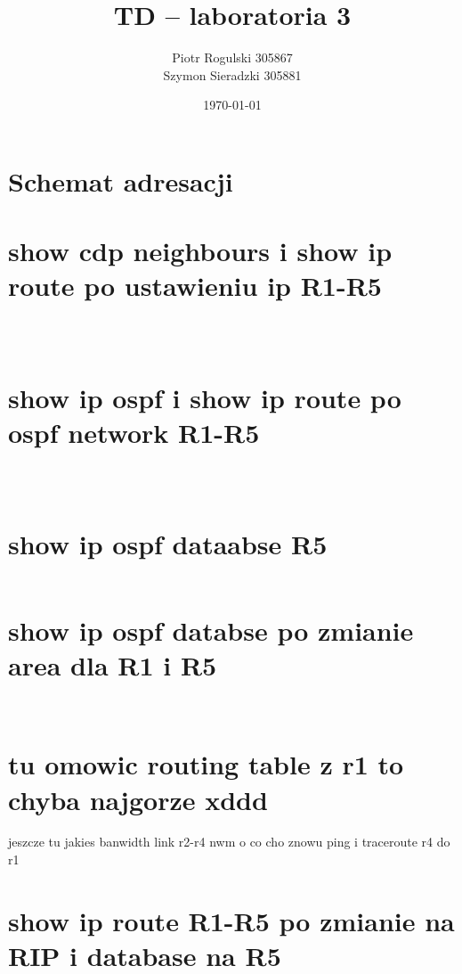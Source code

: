 \documentclass[a4paper,12pt,notitlepage]{article}
\title{\textbf{TD -- laboratoria 3}}
\author{Piotr Rogulski 305867 \\ Szymon Sieradzki 305881}
\date{\today}
\begin{document}
\maketitle
\section{Schemat adresacji}

\section{show cdp neighbours i show ip route po ustawieniu ip R1-R5}
\inputminted[label=Przełączanie na ipv6, firstline=152, lastline=170]{text}{R1.txt}
\inputminted[label=Przełączanie na ipv6, firstline=293, lastline=316]{text}{R2_1.txt}
\inputminted[label=Przełączanie na ipv6, firstline=210, lastline=237]{text}{R5.txt}
\section{show ip ospf i show ip route po ospf network R1-R5}
\inputminted[label=Przełączanie na ipv6, firstline=228, lastline=279]{text}{R1.txt}
\inputminted[label=Przełączanie na ipv6, firstline=366, lastline=422]{text}{R2_1.txt}
\inputminted[label=Przełączanie na ipv6, firstline=285, lastline=339]{text}{R5.txt}
\section{show ip ospf dataabse R5}
\inputminted[label=Przełączanie na ipv6, firstline=366, lastline=595]{text}{R5.txt}
\section{show ip ospf databse po zmianie area dla R1 i R5}
\inputminted[label=Przełączanie na ipv6, firstline=309, lastline=390]{text}{R1.txt}
\inputminted[label=Przełączanie na ipv6, firstline=597, lastline=680]{text}{R5.txt}
\section{tu omowic routing table z r1 to chyba najgorze xddd}
jeszcze tu jakies banwidth link r2-r4 nwm o co cho
znowu ping i traceroute r4 do r1
\section{show ip route R1-R5 po zmianie na RIP i database na R5}
\inputminted[label=Przełączanie na ipv6, firstline=829, lastline=844]{text}{R1.txt}
\inputminted[label=Przełączanie na ipv6, firstline=709, lastline=817]{text}{R5.txt}
\end{document}
